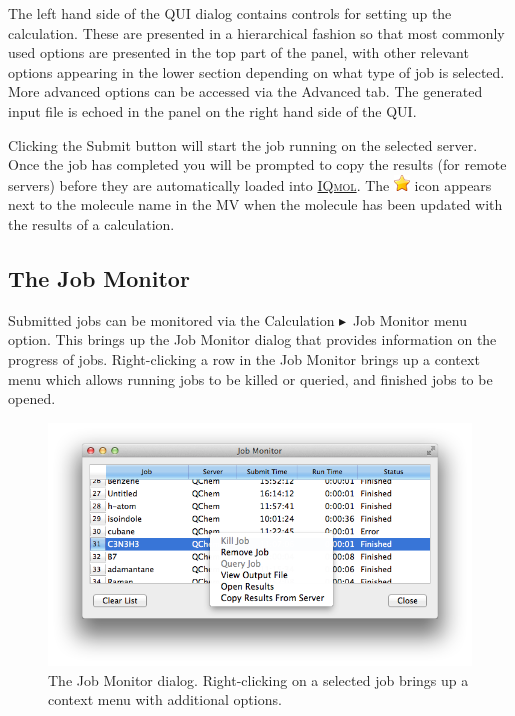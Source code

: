 \documentclass[a4paper,12pt]{article}
\newcommand{\iqmol}{\href{http://iqmol.org}{{\scshape IQmol}}}
\newcommand{\bt}{\ensuremath{\blacktriangleright}}
\begin{document}
The left hand side of the QUI dialog contains controls for setting up the
calculation.  These are presented in a hierarchical fashion so that most
commonly used options are presented in the top part of the panel, with other
relevant options appearing in the lower section depending on what type of job
is selected.  More advanced options can be accessed via the Advanced tab.  The
generated input file is echoed in the panel on the right hand side of the QUI.

Clicking the Submit button will start the job running on the selected server.
Once the job has completed you will be prompted to copy the results (for remote
servers) before they are automatically loaded into \iqmol{}.  The
\includegraphics[scale=0.6]{figures/Favourites.png} icon appears next to the
molecule name in the MV when the molecule has been updated with the
results of a calculation.


\subsection{The Job Monitor}

Submitted jobs can be monitored via the Calculation \bt\ Job Monitor menu
option.  This brings up the Job Monitor dialog that provides information on the
progress of jobs.  Right-clicking a row in the Job Monitor brings up a context
menu which allows running jobs to be killed or queried, and finished jobs to be
opened.
\begin{figure}
\begin{center}
\includegraphics[scale=0.5]{figures/JobMonitor.png} 
\caption{The Job Monitor dialog.  Right-clicking on a selected job brings up
a context menu with additional options.}
\end{center}
\end{figure}
\end{document}
